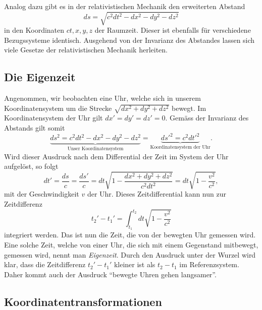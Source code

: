 Analog dazu gibt es in der relativistischen Mechanik den erweiterten Abstand
\begin{equation}
    ds = \sqrt{c^2dt^2 - dx^2 - dy^2 - dz^2}
    \label{relativ:eqn:abstand-relativ}
\end{equation}
in den Koordinaten \(ct, x, y, z\) der Raumzeit.
Dieser ist ebenfalls für verschiedene Bezugssysteme identisch.
Ausgehend von der Invarianz des Abstandes lassen sich
viele Gesetze der relativistischen Mechanik herleiten.


\subsection{Die Eigenzeit 
\label{relativ:section:eigenzeit}}

Angenommen, wir beobachten eine Uhr,
welche sich in unserem Koordinatensystem um die Strecke
\(\sqrt{dx^2 + dy^2 + dz^2}\)
bewegt.
Im Koordinatensystem der Uhr gilt
\(dx' = dy' = dz' = 0\).
Gemäss der Invarianz des Abstands gilt somit
\begin{equation*}
    \underbrace{ds^2 = c^2 dt^2 - dx^2 - dy^2 - dz^2}_{\text{Unser Koordinatensystem}}
        = \underbrace{ds'^2 = c^2 dt'^2}_{\text{Koordinatensystem der Uhr}} .
\end{equation*}
Wird dieser Ausdruck nach dem Differential der Zeit im System der Uhr aufgelöst,
so folgt
\begin{equation}
    dt' = \frac{ds}{c} = \frac{ds'}{c}
    = dt \sqrt{1 - \frac{dx^2+dy^2+dz^2}{c^2 dt^2}}
    = dt \sqrt{1 - \frac{v^2}{c^2}},
    \label{relativ:eqn:differential-eigenzeit}
\end{equation}
mit der Geschwindigkeit \(v\) der Uhr.
Dieses Zeitdifferential kann nun zur Zeitdifferenz
\begin{equation}
    t_2' - t_1' = \int_{t_1}^{t_2} dt \sqrt{1 - \frac{v^2}{c^2}}
    \label{relativ:eqn:eigenzeit}
\end{equation}
integriert werden.
Das ist nun die Zeit, die von der bewegten Uhr gemessen wird.
Eine solche Zeit, welche von einer Uhr,
die sich mit einem Gegenstand mitbewegt, gemessen wird,
nennt man \emph{Eigenzeit}.
Durch den Ausdruck unter der Wurzel wird klar,
dass die Zeitdifferenz \(t_2'- t_1'\) kleiner ist
als \(t_2 - t_1\) im Referenzsystem.
Daher kommt auch der Ausdruck
``bewegte Uhren gehen langsamer''.


\subsection{Koordinatentransformationen 
\label{relativ:section:koordtrafo}}

